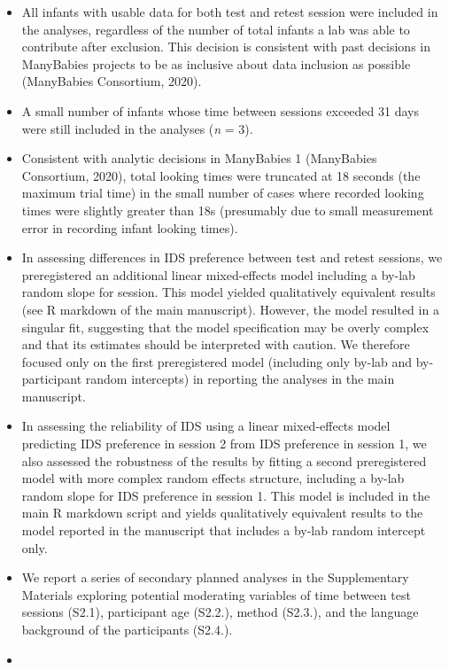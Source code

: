 \documentclass[
  man, donotrepeattitle,floatsintext]{apa6}
\providecommand{\tightlist}{%
  \setlength{\itemsep}{0pt}\setlength{\parskip}{0pt}}
\begin{document}
\begin{itemize}
\tightlist
\item
  All infants with usable data for both test and retest session were included in the analyses, regardless of the number of total infants a lab was able to contribute after exclusion. This decision is consistent with past decisions in ManyBabies projects to be as inclusive about data inclusion as possible (ManyBabies Consortium, 2020).
\item
  A small number of infants whose time between sessions exceeded 31 days were still included in the analyses (\emph{n} = 3).
\item
  Consistent with analytic decisions in ManyBabies 1 (ManyBabies Consortium, 2020), total looking times were truncated at 18 seconds (the maximum trial time) in the small number of cases where recorded looking times were slightly greater than 18s (presumably due to small measurement error in recording infant looking times).
\item
  In assessing differences in IDS preference between test and retest sessions, we preregistered an additional linear mixed-effects model including a by-lab random slope for session. This model yielded qualitatively equivalent results (see R markdown of the main manuscript). However, the model resulted in a singular fit, suggesting that the model specification may be overly complex and that its estimates should be interpreted with caution. We therefore focused only on the first preregistered model (including only by-lab and by-participant random intercepts) in reporting the analyses in the main manuscript.
\item
  In assessing the reliability of IDS using a linear mixed-effects model predicting IDS preference in session 2 from IDS preference in session 1, we also assessed the robustness of the results by fitting a second preregistered model with more complex random effects structure, including a by-lab random slope for IDS preference in session 1. This model is included in the main R markdown script and yields qualitatively equivalent results to the model reported in the manuscript that includes a by-lab random intercept only.
\item
  We report a series of secondary planned analyses in the Supplementary Materials exploring potential moderating variables of time between test sessions (S2.1), participant age (S2.2.), method (S2.3.), and the language background of the participants (S2.4.).
\item

\end{itemize}
\end{document}
